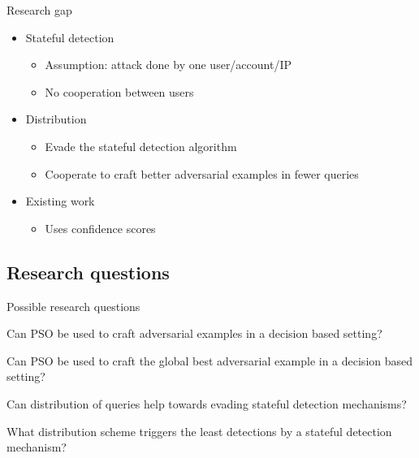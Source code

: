 \documentclass[11pt,t]{beamer}
\begin{document}
\begin{frame}{Research gap}
\begin{itemize}
	\item Stateful detection
	\begin{itemize}
		\item Assumption: attack done by \alert{one} user/account/IP
		\item No cooperation between users
	\end{itemize}
	
	\item Distribution
	\begin{itemize}
		\item Evade the stateful detection algorithm
		\item Cooperate to craft better adversarial examples in fewer queries
	\end{itemize}
	
	\item Existing work
	\begin{itemize}
		\item Uses confidence scores \cite{10.1007/978-3-030-59013-0_22, s20247158}
	\end{itemize}
\end{itemize}
\end{frame}

\subsection{Research questions}
\begin{frame}{Possible research questions}
	\begin{exampleblock}
	{Can PSO be used to craft adversarial examples in a decision based setting?}
	\end{exampleblock}
	\begin{exampleblock}
	{Can PSO be used to craft the global best adversarial example in a decision based setting?}
	\end{exampleblock}
	\begin{exampleblock}
	{Can distribution of queries help towards evading stateful detection mechanisms?}
	\end{exampleblock}
	\begin{exampleblock}
	{What distribution scheme triggers the least detections by a stateful detection mechanism?}
	\end{exampleblock}

\end{frame}
\end{document}
